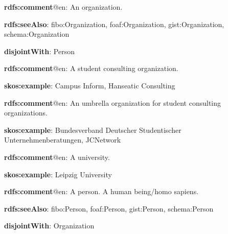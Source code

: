 \documentclass[a4paper, DIV=13, BCOR=0cm]{scrbook}
\begin{document}
\begin{mdframed}[style=onto-1, frametitle={Organization}]
	{%
		\begin{compactitem}
			\item \textbf{rdfs:comment}@en: An organization.
			\item \textbf{rdfs:seeAlso}: fibo:Organization, foaf:Organization, 
			gist:Organization, \\ schema:Organization
			\item \textbf{disjointWith}: Person
		\end{compactitem}
	} %
\end{mdframed}

\begin{mdframed}[style=onto-2, frametitle={Student Consulting Organization}]
	{%
		\begin{compactitem}
			\item \textbf{rdfs:comment}@en: A student consulting organization.
			\item \textbf{skos:example}: Campus Inform, Hanseatic Consulting
		\end{compactitem}
	} %
\end{mdframed}

\begin{mdframed}[style=onto-2, frametitle={Umbrella Organization}]
	{%
		\begin{compactitem}
			\item \textbf{rdfs:comment}@en: An umbrella organization for student consulting organizations.
			\item \textbf{skos:example}: Bundesverband Deutscher Studentischer Unternehmenberatungen, JCNetwork
		\end{compactitem}
	} %
\end{mdframed}

\begin{mdframed}[style=onto-2, frametitle={University}]
	{%
		\begin{compactitem}
			\item \textbf{rdfs:comment}@en: A university.
			\item \textbf{skos:example}: Leipzig University
		\end{compactitem}
	} %
\end{mdframed}

\begin{mdframed}[style=onto-1, frametitle={Person}]
	{%
		\begin{compactitem}
			\item \textbf{rdfs:comment}@en: A person. A human being/homo sapiens.
			\item \textbf{rdfs:seeAlso}: fibo:Person, foaf:Person, gist:Person, 
			schema:Person
			\item \textbf{disjointWith}: Organization
		\end{compactitem}
	} %
\end{mdframed}
\end{document}
